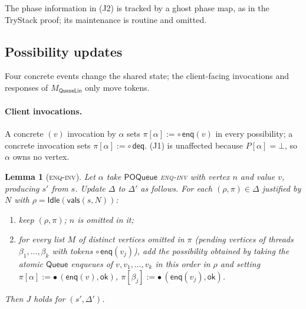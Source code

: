 \documentclass[11pt]{article}
\newtheorem{lemma}{Lemma}[section]
\theoremstyle{definition}
\theoremstyle{remark}
\newcommand{\Idle}{\mathsf{Idle}}
\newcommand{\Enq}{\mathsf{enq}}
\newcommand{\Deq}{\mathsf{deq}}
\newcommand{\ok}{\mathsf{ok}}
\newcommand{\vals}{\mathsf{vals}}
\newcommand{\poss}{\Delta}
\newcommand{\abst}{\rho}
\newcommand{\tokens}{\pi}
\newcommand{\code}[1]{\texttt{\detokenize{#1}}}
\newcommand{\POQueue}{\mathsf{POQueue}}
\newcommand{\Queue}{\mathsf{Queue}}
\newcommand{\QLin}{\mathsf{QueueLin}}
\newcommand{\tok}[1]{\circ\,#1}
\newcommand{\done}[2]{\bullet\,(#1,#2)}
\begin{document}
The phase information in (J2) is tracked by a ghost phase map, as in the
TryStack proof; its maintenance is routine and omitted.

\subsection{Possibility updates}

Four concrete events change the shared state; the client-facing invocations
and responses of $M_{\QLin}$ only move tokens.

\paragraph{Client invocations.}
A concrete \code{enq}$(v)$ invocation by $\alpha$ sets
$\tokens[\alpha] := \tok{\Enq(v)}$ in every possibility; a concrete
\code{deq} invocation sets $\tokens[\alpha] := \tok{\Deq}$.  (J1) is
unaffected because $P[\alpha] = \bot$, so $\alpha$ owns no vertex.

\begin{lemma}[\textsc{enq-inv}]\label{lem:l2-enqinv}
Let $\alpha$ take $\POQueue$ \textsc{enq-inv} with vertex $n$ and value
$v$, producing $s'$ from $s$.  Update $\poss$ to $\poss'$ as follows.  For
each $(\abst, \tokens) \in \poss$ justified by $N$ with $\abst =
\Idle(\vals(s,N))$:
\begin{enumerate}[label=(\alph*),nosep]
\item keep $(\abst, \tokens)$; $n$ is omitted in it;
\item for every list $M$ of distinct vertices omitted in $\tokens$
  (pending vertices of threads $\beta_1, \dots, \beta_k$ with tokens
  $\tok{\Enq(v_j)}$), add the possibility obtained by taking the atomic
  $\Queue$ enqueues of $v, v_1, \dots, v_k$ in this order in $\abst$ and
  setting $\tokens[\alpha] := \done{\Enq(v)}{\ok}$,
  $\tokens[\beta_j] := \done{\Enq(v_j)}{\ok}$.
\end{enumerate}
Then $J$ holds for $(s', \poss')$.
\end{lemma}
\end{document}
